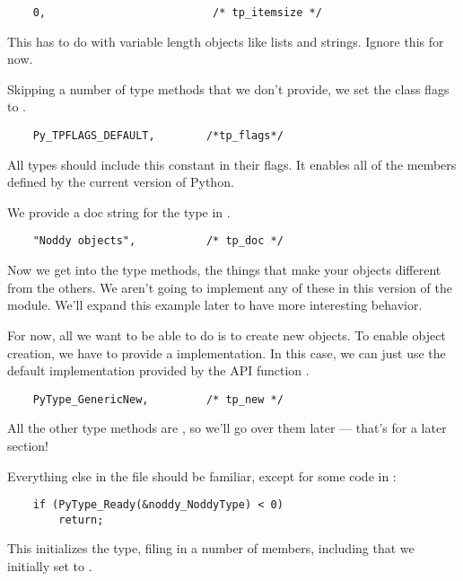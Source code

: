 \begin{verbatim}
    0,                          /* tp_itemsize */
\end{verbatim}

This has to do with variable length objects like lists and strings.
Ignore this for now.

Skipping a number of type methods that we don't provide, we set the
class flags to . 

\begin{verbatim}
    Py_TPFLAGS_DEFAULT,        /*tp_flags*/
\end{verbatim}

All types should include this constant in their flags.  It enables all
of the members defined by the current version of Python.

We provide a doc string for the type in .

\begin{verbatim}
    "Noddy objects",           /* tp_doc */
\end{verbatim}

Now we get into the type methods, the things that make your objects
different from the others.  We aren't going to implement any of these
in this version of the module.  We'll expand this example later to 
have more interesting behavior.  

For now, all we want to be able to do is to create new 
objects. To enable object creation, we have to provide a
 implementation. In this case, we can just use the
default implementation provided by the API function
.

\begin{verbatim}
    PyType_GenericNew,         /* tp_new */
\end{verbatim}

All the other type methods are \NULL, so we'll go over them later
--- that's for a later section!

Everything else in the file should be familiar, except for some code
in :

\begin{verbatim}
    if (PyType_Ready(&noddy_NoddyType) < 0)
        return;
\end{verbatim}

This initializes the  type, filing in a number of
members, including  that we initially set to \NULL.


